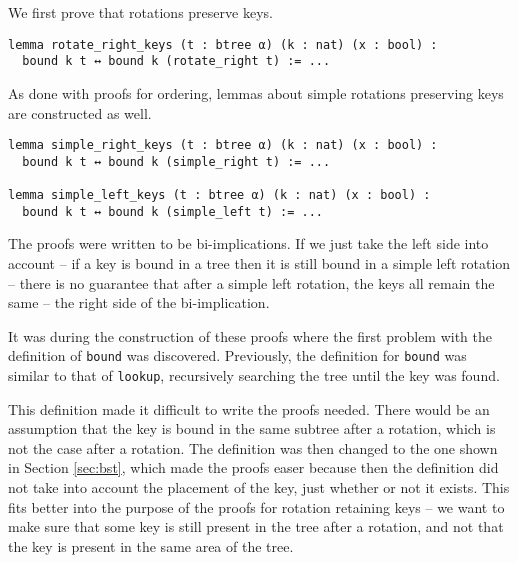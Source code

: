 We first prove that rotations preserve keys.

\begin{lstlisting}
lemma rotate_right_keys (t : btree α) (k : nat) (x : bool) :
  bound k t ↔ bound k (rotate_right t) := ...
\end{lstlisting}

As done with proofs for ordering, lemmas about simple rotations preserving keys are constructed as well.

\begin{lstlisting}
lemma simple_right_keys (t : btree α) (k : nat) (x : bool) :
  bound k t ↔ bound k (simple_right t) := ...
  
lemma simple_left_keys (t : btree α) (k : nat) (x : bool) :
  bound k t ↔ bound k (simple_left t) := ...
\end{lstlisting}

The proofs were written to be bi-implications. If we just take the left side into account -- if a key is bound in a tree then it is still bound in a simple left rotation -- there is no guarantee that after a simple left rotation, the keys all remain the same -- the right side of the bi-implication.  

It was during the construction of these proofs where the first problem with the definition of \lstinline{bound} was discovered. Previously, the definition for \lstinline{bound} was similar to that of \lstinline{lookup}, recursively searching the tree until the key was found.

This definition made it difficult to write the proofs needed. There would be an assumption that the key is bound in the same subtree after a rotation, which is not the case after a rotation. The definition was then changed to the one shown in Section \ref{sec:bst}, which made the proofs easer because then the definition did not take into account the placement of the key, just whether or not it exists. This fits better into the purpose of the proofs for rotation retaining keys -- we want to make sure that some key is still present in the tree after a rotation, and not that the key is present in the same area of the tree.